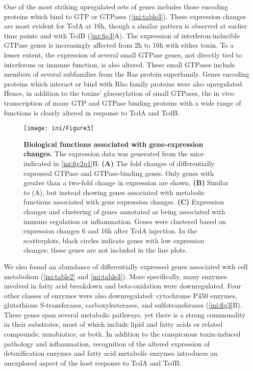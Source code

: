 One of the most striking upregulated sets of genes includes those 
encoding proteins which bind to GTP or GTPases (\autoref{ini:table3}). 
These expression changes are most evident for TcdA at 16h, though a 
similar pattern is observed at earlier time points and with TcdB 
(\autoref{ini:fig3}A). The expression of interferon-inducible GTPase 
genes is increasingly affected from 2h to 16h with either toxin. To a 
lesser extent, the expression of several small GTPase genes, not 
directly tied to interferons or immune function, is also altered. These 
small GTPases include members of several subfamilies from the Ras protein 
superfamily. Genes encoding proteins which interact or bind with Rho 
family proteins were also upregulated. Hence, in addition to the 
toxins' glucosylation of small GTPases, the in vivo transcription of 
many GTP and GTPase binding proteins with a wide range of functions 
is clearly altered in response to TcdA and TcdB.

\begin{figure}[h!]
  \centering
  \texttt{[image: ini/Figure3]}
  \caption[Biological functions associated with gene-expression changes]{
       \textbf{Biological functions associated with gene-expression changes.}
       The expression data was generated from the mice indicated 
       in \autoref{ini:fig2p1}B. \textbf{(A)} The fold changes of 
       differentially expressed GTPase and GTPase-binding genes. 
       Only genes with greater than a two-fold change in expression 
       are shown. \textbf{(B)} Similar to (A), but instead showing 
       genes associated with metabolic functions associated with gene 
       expression changes. \textbf{(C)} Expression changes and clustering 
       of genes annotated as being associated with immune regulation 
       or inflammation. Genes were clustered based on expression 
       changes 6 and 16h after TcdA injection. In the scatterplots, 
       black circles indicate genes with low expression changes; 
       these genes are not included in the line plots.
  }
  \label{ini:fig3}
\end{figure}


We also found an abundance of differentially expressed genes 
associated with cell metabolism (\autoref{ini:table2} and 
\autoref{ini:table3}). More specifically, many enzymes involved 
in fatty acid breakdown and beta-oxidation were downregulated. 
Four other classes of enzymes were also downregulated: cytochrome 
P450 enzymes, glutathione S-transferases, carboxylesterases, and 
sulfotransferases (\autoref{ini:fig3}B). These genes span several 
metabolic pathways, yet there is a strong commonality in their 
substrates, most of which include lipid and fatty acids or related 
compounds; xenobiotics; or both. In addition to the conspicuous 
toxin-induced pathology and inflammation, recognition of the altered 
expression of detoxification enzymes and fatty acid metabolic 
enzymes introduces an unexplored aspect of the host response to 
TcdA and TcdB.

